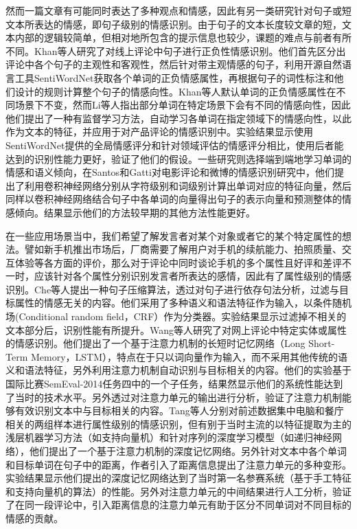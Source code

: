 然而一篇文章有可能同时表达了多种观点和情感，因此有另一类研究针对句子或短文本所表达的情感，即句子级别的情感识别。由于句子的文本长度较文章的短，文本内部的逻辑较简单，但相对地所包含的提示信息也较少，课题的难点与前者有所不同。Khan等人\cite{khan2011sentiment}研究了对线上评论中句子进行正负性情感识别。他们首先区分出评论中各个句子的主观性和客观性，然后针对带主观情感的句子，利用开源自然语言工具SentiWordNet获取各个单词的正负情感属性，再根据句子的词性标注和他们设计的规则计算整个句子的情感向性。Khan等人默认单词的正负情感属性在不同场景下不变，然而Li等人\cite{li2013constructing}指出部分单词在特定场景下会有不同的情感向性，因此他们提出了一种有监督学习方法，自动学习各单词在指定领域下的情感向性，以此作为文本的特征，并应用于对产品评论的情感识别中。实验结果显示使用SentiWordNet提供的全局情感评分和针对领域评估的情感评分相比，使用后者能达到的识别性能力更好，验证了他们的假设。一些研究则选择端到端地学习单词的情感和语义倾向，在Santos和Gatti\cite{dos2014deep}对电影评论和微博的情感识别研究中，他们提出了利用卷积神经网络分别从字符级别和词级别计算出单词对应的特征向量，然后同样以卷积神经网络结合句子中各单词的向量得出句子的表示向量和预测整体的情感倾向。结果显示他们的方法较早期的其他方法性能更好。

在一些应用场景当中，我们希望了解发言者对某个对象或者它的某个特定属性的想法。譬如新手机推出市场后，厂商需要了解用户对手机的续航能力、拍照质量、交互体验等各方面的评价，那么对于评论中同时谈论手机的多个属性且好评和差评不一时，应该针对各个属性分别识别发言者所表达的感情，因此有了属性级别的情感识别。Che等人\cite{che2015sentence}提出一种句子压缩算法，透过对句子进行依存句法分析，过滤与目标属性的情感无关的内容。他们采用了多种语义和语法特征作为输入，以条件随机场(Conditional random field，CRF）作为分类器。实验结果显示过滤掉不相关的文本部分后，识别性能有所提升。Wang等人\cite{wang2016attention}研究了对网上评论中特定实体或属性的情感识别。他们提出了一个基于注意力机制的长短时记忆网络（Long Short-Term Memory，LSTM），特点在于只以词向量作为输入，而不采用其他传统的语义和语法特征，另外利用注意力机制自动识别与目标相关的内容。他们的实验基于国际比赛SemEval-2014任务四\cite{pontiki2014semeval}中的一个子任务，结果然显示他们的系统性能达到了当时的技术水平。另外透过对注意力单元的输出进行分析，验证了注意力机制能够有效识别文本中与目标相关的内容。Tang等人\cite{tang2016aspect}分别对前述数据集中电脑和餐庁相关的两组样本进行属性级别的情感识别，但有别于当时主流的以特征提取为主的浅层机器学习方法（如支持向量机）和针对序列的深度学习模型（如递归神经网络），他们提出了一个基于注意力机制的深度记忆网络。另外针对文本中各个单词和目标单词在句子中的距离，作者引入了距离信息提出了注意力单元的多种变形。实验结果显示他们提出的深度记忆网络达到了当时第一名参赛系统（基于手工特征和支持向量机的算法）的性能。另外对注意力单元的中间结果进行人工分析，验证了在同一段评论中，引入距离信息的注意力单元有助于区分不同单词对不同目标的情感的贡献。

